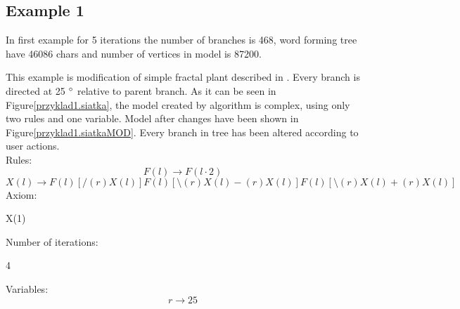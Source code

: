 \documentclass[b5paper,twoside,11pt]{article}
\renewcommand{\figurename}{Figure}
\begin{document}
\subsection*{Example 1}
In first example for 5 iterations the number of branches is 468, word forming tree have 46086 chars and number of vertices in model is 87200.\par
This example is modification of simple fractal plant described in \cite{prusinABOP}.
Every branch is directed at 25  $\degree$ relative to parent branch. As it can be seen in \figurename \ref{przyklad1.siatka}, the model created by algorithm is complex, using only two rules and one variable. Model after changes have been shown in \figurename \ref{przyklad1.siatkaMOD}. Every branch in tree has been altered according to user actions.\\ 
Rules: \newline
\begin{equation}
F(l)\rightarrow F(l\cdot2) 
\end{equation}
\begin{equation}
X(l) \rightarrow F(l)[/(r)X(l)]F(l)[\setminus(r)X(l)-(r)X(l)]F(l)[\setminus(r)X(l)+(r)X(l)] 
\end{equation}
Axiom:
\begin{center}
X(1)
\end{center}
Number of iterations:
\begin{center}
4
\end{center}
Variables:
\begin{equation}
r\rightarrow 25
\end{equation}
\end{document}
